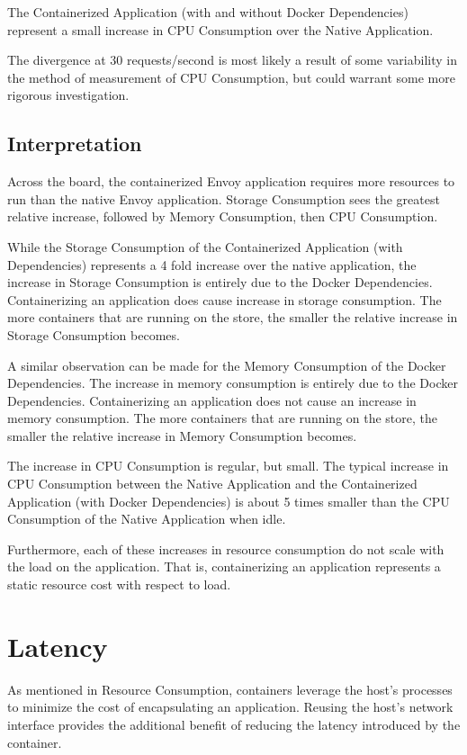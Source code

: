 \documentclass{article}
\begin{document}
The Containerized Application (with and without Docker Dependencies) represent a small increase in CPU Consumption over the Native Application.

The divergence at 30 requests/second is most likely a result of some variability in the method of measurement of CPU Consumption, but could warrant some more rigorous investigation.

\subsection{Interpretation}
Across the board, the containerized Envoy application requires more resources to run than the native Envoy application. Storage Consumption sees the greatest relative increase, followed by Memory Consumption, then CPU Consumption.

While the Storage Consumption of the Containerized Application (with Dependencies) represents a 4 fold increase over the native application, the increase in Storage Consumption is entirely due to the Docker Dependencies. Containerizing an application does cause increase in storage consumption. The more containers that are running on the store, the smaller the relative increase in Storage Consumption becomes.

A similar observation can be made for the Memory Consumption of the Docker Dependencies. The increase in memory consumption is entirely due to the Docker Dependencies. Containerizing an application does not cause an increase in memory consumption. The more containers that are running on the store, the smaller the relative increase in Memory Consumption becomes.

The increase in CPU Consumption is regular, but small. The typical increase in CPU Consumption between the Native Application and the Containerized Application (with Docker Dependencies) is about 5 times smaller than the CPU Consumption of the Native Application when idle.

Furthermore, each of these increases in resource consumption do not scale with the load on the application. That is, containerizing an application represents a static resource cost with respect to load.

\section{Latency}
As mentioned in Resource Consumption, containers leverage the host's processes to minimize the cost of encapsulating an application. Reusing the host's network interface provides the additional benefit of reducing the latency introduced by the container.
\end{document}
